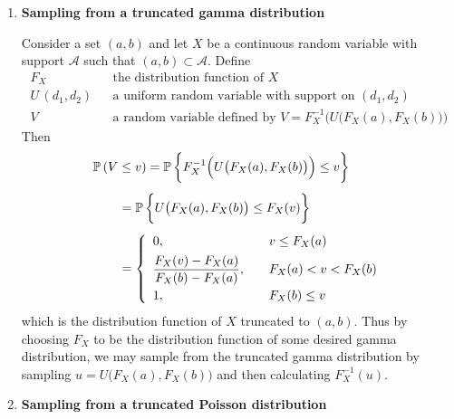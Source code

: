 \documentclass[11pt]{article}
\newcommand{\prob}{\mathbb{P}\,}
\begin{document}
\begin{enumerate}[label=(\roman*), itemsep=10mm]
\item \textbf{Sampling from a truncated gamma distribution}

Consider a set $(a,b)$ and let $X$ be a continuous random variable with support $\mathcal{A}$ such that $(a,b) \subset \mathcal{A}$.  Define
\[ \begin{array}{lll}
F_X & & \text{the distribution function of $X$} \\[1ex]
U\,(d_1,d_2) & & \text{a uniform random variable with support on $(d_1,d_2)$} \\[1ex]
V & & \text{a random variable defined by $V = F_X^{-1}\Big( U\big( F_X(a), F_X(b) \big) \Big)$}
\end{array} \]
Then
\begin{align*} \MoveEqLeft
\prob(V \leq v) = \prob \bigg\{ F_X^{-1}\Big( U\big( F_X(a), F_X(b) \big) \Big) \leq v \bigg\} \\[1ex]
&= \prob \bigg\{ U\big( F_X(a), F_X(b) \big) \leq F_X(v) \bigg\} \\[1ex]
&= \left\{ \begin{array}{lll}
0, & & v \leq F_X(a) \\[1ex]
\displaystyle \frac{ F_X(v) - F_X(a) }{ F_X(b) - F_X(a) }, & & F_X(a) < v < F_X(b) \\[2ex]
1, & & F_X(b) \leq v
\end{array} \right. \end{align*}
which is the distribution function of $X$ truncated to $(a,b)$.  Thus by choosing $F_X$ to be the distribution function of some desired gamma distribution, we may sample from the truncated gamma distribution by sampling $u = U\big( F_X(a), F_X(b) \big)$ and then calculating $F_X^{-1}(u)$. 





\item \textbf{Sampling from a truncated Poisson distribution}


\end{enumerate}
\end{document}
